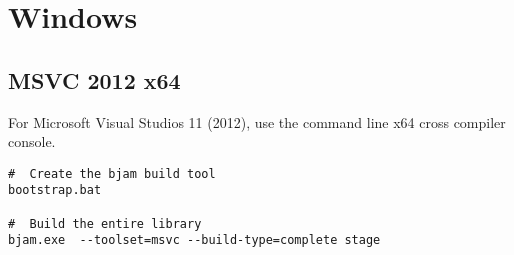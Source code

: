 \documentclass[12pt]{report}
\begin{document}
\section*{Windows}

\subsection*{MSVC 2012 x64}
For Microsoft Visual Studios 11 (2012), use the command line x64 cross
compiler console.

\begin{verbatim}
#  Create the bjam build tool
bootstrap.bat

#  Build the entire library
bjam.exe  --toolset=msvc --build-type=complete stage
\end{verbatim}
\end{document}
